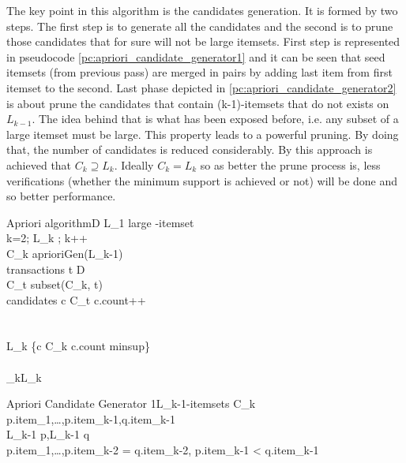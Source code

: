 The key point in this algorithm is the candidates generation. It is formed by
two steps. The first step is to generate all the candidates and the second is to
prune those candidates that for sure will not be large itemsets. First step is
represented in pseudocode \ref{pc:apriori_candidate_generator1} and it can be
seen that seed itemsets (from previous pass) are merged in pairs by adding last
item from first itemset to the second. Last phase depicted in
\ref{pc:apriori_candidate_generator2} is about prune the candidates
that contain (k-1)-itemsets that do not exists on $L_{k-1}$. The idea behind
that is what has been exposed before, i.e. any subset of a large itemset must
be large. This property leads to a powerful pruning. By doing that, the 
number of candidates is reduced considerably. By this approach is achieved 
that $C_{k} \supseteq L_{k}$. Ideally $C_{k} = L_{k}$
so as better the prune process is, less verifications (whether the minimum
support is achieved or not) will be done and so better performance.

\begin{pseudocode}{Apriori algorithm}{D}
\label{pc:apriori}
    L_{1} \GETS large -itemset
	\\
    \FOR k=2; L_{k} \neq \emptyset; k++ \DO
	\BEGIN
         \\
        C_{k} \GETS aprioriGen(L_{k-1})\\
        \FORALL transactions \quad t \in D \DO
        \BEGIN
             \\
            C_{t} \GETS subset(C_{k}, t)\\
            \FORALL candidates \quad c \in C_{t} \DO
            \BEGIN
                c.count++\\
            \END\\
        \END\\
        L_{k} \GETS \{c \in C_{k} \mid c.count \geq minsup\}
	\END\\
	\\

    \RETURN \bigcup_{k}L_{k}
\end{pseudocode}

\begin{pseudocode}{Apriori Candidate Generator 1}{L_{k-1}-itemsets}
\label{pc:apriori_candidate_generator1}
 \quad C_{k}\\
 \quad p.item_{1},\ldots,p.item_{k-1},q.item_{k-1}\\
 \quad L_{k-1} \quad p,L_{k-1} \quad q\\
 \quad p.item_{1},\ldots,p.item_{k-2} = q.item_{k-2}, 
p.item_{k-1} < q.item_{k-1}\\
\end{pseudocode}


